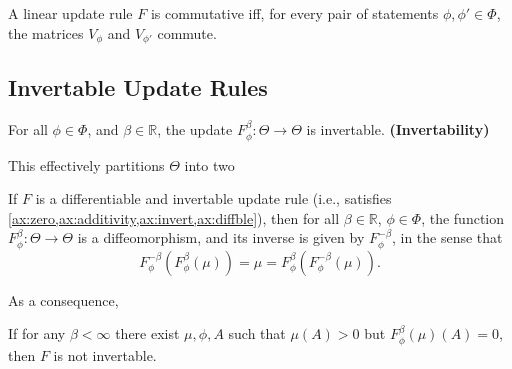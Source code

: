 \documentclass{article}
\begin{document}
\begin{prop}
    A linear update rule $F$ is commutative iff, for every pair of statements  $\phi, \phi' \in \Phi$, the
    matrices $V_\phi$ and $V_{\phi'}$ commute.
\end{prop}



\subsection{Invertable Update Rules}
\begin{CFaxioms}
    \item For all $\phi\in\Phi$, and $\beta \in \mathbb R$, the update
    $F^{\beta}_{\phi}: \Theta \to \Theta$ is invertable.
    \hfill\textbf{(Invertability)} \label{ax:invert}
\end{CFaxioms}


This effectively partitions $\Theta$ into two


\begin{prop}
    If $F$ is a differentiable and invertable update rule (i.e., satisfies \cref{ax:zero,ax:additivity,ax:invert,ax:diffble}), then for all $\beta \in \mathbb R$, $\phi \in \Phi$, the function
    $F^\beta_\phi : \Theta \to \Theta$
    is a diffeomorphism, and its inverse is given by $F^{-\beta}_\phi$, in the sense that
    \[
        F^{-\beta}_\phi( F^{\beta}_\phi (\mu) ) = \mu = F^{\beta}_\phi( F^{-\beta}_\phi (\mu) ).
     \]
\end{prop}




As a consequence,
\begin{coro}
    If for any $\beta < \infty$ there exist $\mu, \phi, A$ such that
    $\mu(A) > 0$  but $F^{\beta}_\phi(\mu)(A) = 0$, then $F$ is not invertable.
\end{coro}
\end{document}
